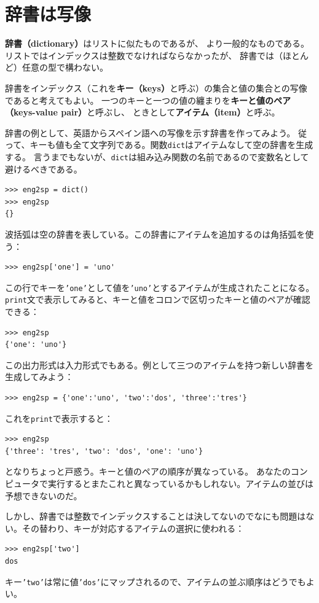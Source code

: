 \documentclass[a4j,12pt,makeidx]{jbook}
\begin{document}
\section{辞書は写像}
{\bf 辞書（dictionary）}はリストに似たものであるが、
より一般的なものである。リストではインデックスは整数でなければならなかったが、
辞書では（ほとんど）任意の型で構わない。\par
辞書をインデックス（これを{\bf キー（keys）}と呼ぶ）の集合と値の集合との写像であると考えてもよい。
一つのキーと一つの値の纏まりを{\bf キーと値のペア（keys-value pair）}と呼ぶし、
ときとして{\bf アイテム（item）}と呼ぶ。\par
辞書の例として、英語からスペイン語への写像を示す辞書を作ってみよう。
従って、キーも値も全て文字列である。関数{\tt dict}はアイテムなして空の辞書を生成する。
言うまでもないが、{\tt dict}は組み込み関数の名前であるので変数名として避けるべきである。
\begin{verbatim}
>>> eng2sp = dict()
>>> eng2sp
{}
\end{verbatim}
波括弧{}は空の辞書を表している。この辞書にアイテムを追加するのは角括弧を使う：
\begin{verbatim}
>>> eng2sp['one'] = 'uno'
\end{verbatim}
この行でキーを{\tt 'one'}として値を{\tt 'uno'}とするアイテムが生成されたことになる。
{\tt print}文で表示してみると、キーと値をコロンで区切ったキーと値のペアが確認できる：
\begin{verbatim}
>>> eng2sp
{'one': 'uno'}
\end{verbatim}
この出力形式は入力形式でもある。例として三つのアイテムを持つ新しい辞書を生成してみよう：
\begin{verbatim}
>>> eng2sp = {'one':'uno', 'two':'dos', 'three':'tres'}
\end{verbatim}
これを{\tt print}で表示すると：
\begin{verbatim}
>>> eng2sp
{'three': 'tres', 'two': 'dos', 'one': 'uno'}
\end{verbatim}
となりちょっと戸惑う。キーと値のペアの順序が異なっている。
あなたのコンピュータで実行するとまたこれと異なっているかもしれない。アイテムの並びは予想できないのだ。\par
しかし、辞書では整数でインデックスすることは決してないのでなにも問題はない。その替わり、キーが対応するアイテムの選択に使われる：
\begin{verbatim}
>>> eng2sp['two']
dos
\end{verbatim}
キー{\tt 'two'}は常に値{\tt 'dos'}にマップされるので、アイテムの並ぶ順序はどうでもよい。 \par
\end{document}
